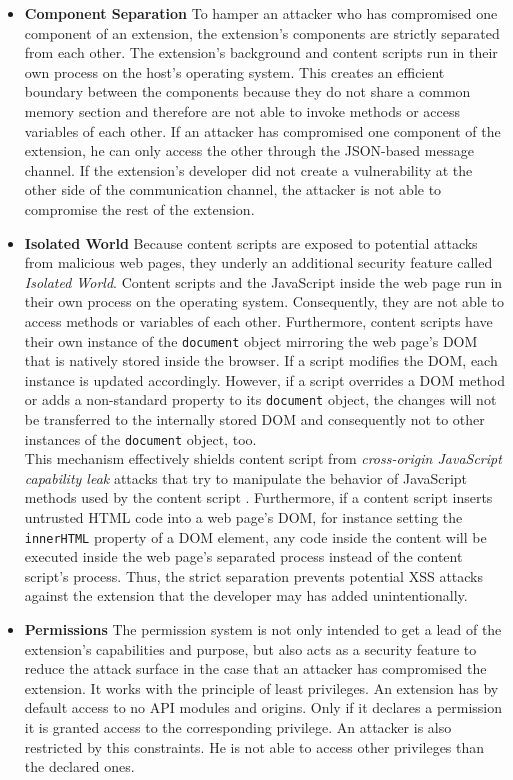 	\begin{itemize}		
		\item \textbf{Component Separation} To hamper an attacker who has compromised one component of an extension, the extension's components are strictly separated from each other. The extension's background and content scripts run in their own process on the host's operating system. This creates an efficient boundary between the components because they do not share a common memory section and therefore are not able to invoke methods or access variables of each other. If an attacker has compromised one component of the extension, he can only access the other through the JSON-based message channel. If the extension's developer did not create a vulnerability at the other side of the communication channel, the attacker is not able to compromise the rest of the extension. 
		
		\item \textbf{Isolated World} Because content scripts are exposed to potential attacks from malicious web pages, they underly an additional security feature called \textit{Isolated World}. Content scripts and the JavaScript inside the web page run in their own process on the operating system. Consequently, they are not able to access methods or variables of each other. Furthermore, content scripts have their own instance of the \texttt{document} object mirroring the web page's DOM that is natively stored inside the browser. If a script modifies the DOM, each instance is updated accordingly. However, if a script overrides a DOM method or adds a non-standard property to its \texttt{document} object, the changes will not be transferred to the internally stored DOM and consequently not to other instances of the \texttt{document} object, too. \\	
		This mechanism effectively shields content script from \textit{cross-origin JavaScript capability leak} attacks that try to manipulate the behavior of JavaScript methods used by the content script \cite{Carlini:2012:EGC:2362793.2362800, Barth:2009:CJC:1855768.1855780}. Furthermore, if a content script inserts untrusted HTML code into a web page's DOM, for instance setting the \texttt{innerHTML} property of a DOM element, any code inside the content will be executed inside the web page's separated process instead of the content script's process. Thus, the strict separation prevents potential XSS attacks against the extension that the developer may has added unintentionally.
	
		\item \textbf{Permissions} The permission system is not only intended to get a lead of the extension's capabilities and purpose, but also acts as a security feature to reduce the attack surface in the case that an attacker has compromised the extension. It works with the principle of least privileges. An extension has by default access to no API modules and origins. Only if it declares a permission it is granted access to the corresponding privilege. An attacker is also restricted by this constraints. He is not able to access other privileges than the declared ones. 
		

\end{itemize}
